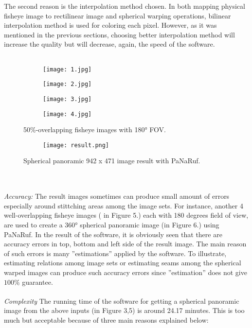 \documentclass{article}
\begin{document}
The second reason is the interpolation method chosen. In both mapping physical fisheye image to rectilinear image and spherical warping operations, bilinear interpolation method is used for coloring each pixel.  However, as it was mentioned in the previous sections, choosing better interpolation method will increase the quality but will decrease, again, the speed of the software.\\~\\
\begin{figure}[h!]
  \centering
  \begin{subfigure}[b]{0.2\linewidth}
    \texttt{[image: 1.jpg]}
  \end{subfigure}
  \begin{subfigure}[b]{0.2\linewidth}
    \texttt{[image: 2.jpg]}
  \end{subfigure}
  \begin{subfigure}[b]{0.2\linewidth}
    \texttt{[image: 3.jpg]}
  \end{subfigure}
  \begin{subfigure}[b]{0.2\linewidth}
    \texttt{[image: 4.jpg]}
  \end{subfigure}
    \caption{50\%-overlapping fisheye images with \ang{180} FOV.}
  \begin{subfigure}[b]{1.0\linewidth}
    \texttt{[image: result.png]}
  \end{subfigure}
  \caption{Spherical panoramic 942 x 471 image result with PaNaRuf.}
\end{figure}
\ \\~\\
\textit{Accuracy:}
The result images sometimes can produce small amount of errors especially around stittching areas among the image sets. For instance, another 4 well-overlapping fisheye images ( in Figure 5.) each with 180 degrees field of view, are used to create a \ang{360} spherical panoramic image (in Figure 6.) using PaNaRuf. In the result of the software, it is obviously seen that there are accuracy errors in top, bottom and left side of the result image. The main reason of such errors is many ''estimations'' applied by the software. To illustrate, estimating relations among image sets or estimating seams among the spherical warped images can produce such accuracy errors since  ''estimation'' does not give $100\%$ guarantee. \\~\\
\textit{Complexity}
The running time of the software for getting a spherical panoramic image from the above inputs (in Figure 3,5) is around 24.17 minutes. This is too much but acceptable because of three main reasons explained below:\\~\\
\end{document}
